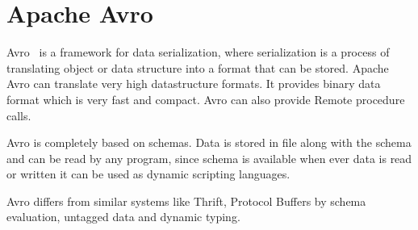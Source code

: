 \section{Apache Avro}

Avro~\cite{hid-sp18-421-AvroCloud} is a framework for data serialization, where
serialization is a process of translating object or data structure into a format
that can be stored. Apache Avro can translate very high datastructure formats.
It provides binary data format which is very fast and compact. Avro can also
provide Remote procedure calls.

Avro is completely based on schemas. Data is stored in file along with the
schema and can be read by any program, since schema is available when ever data
is read or written it can be used as dynamic scripting languages.

Avro differs from similar systems like Thrift, Protocol Buffers by schema
evaluation, untagged data and dynamic typing.

